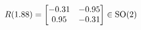 \documentclass[preview]{standalone}
\begin{document}
\begin{align*}
\special{dvisvgm:raw <g id='unique000'>}R(1.88) = \begin{bmatrix} -0.31 & -0.95 \\ 0.95 & -0.31 \end{bmatrix} \in \text{SO}(2)\special{dvisvgm:raw </g>}
\end{align*}
\end{document}
